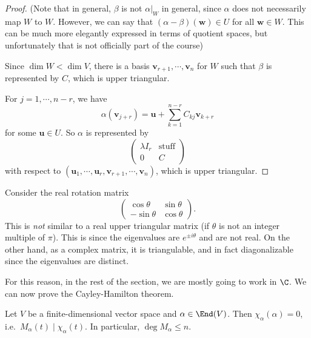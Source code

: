 \documentclass[a4paper]{article}
\begin{document}
\begin{proof}
  (Note that in general, $\beta$ is not $\alpha|_W$ in general, since $\alpha$ does not necessarily map $W$ to $W$. However, we can say that $(\alpha - \beta) (\mathbf{w}) \in U$ for all $\mathbf{w}\in W$. This can be much more elegantly expressed in terms of quotient spaces, but unfortunately that is not officially part of the course)

  Since $\dim W < \dim V$, there is a basis $\mathbf{v}_{r + 1}, \cdots, \mathbf{v}_n$ for $W$ such that $\beta$ is represented by $C$, which is upper triangular.

  For $j = 1, \cdots, n - r$, we have
  \[
    \alpha(\mathbf{v}_{j + r}) = \mathbf{u} + \sum_{k = 1}^{n - r} C_{kj} \mathbf{v}_{k + r}
  \]
  for some $\mathbf{u} \in U$. So $\alpha$ is represented by
  \[
    \begin{pmatrix}
      \lambda I_r & \text{stuff}\\
      0 & C
    \end{pmatrix}
  \]
  with respect to $(\mathbf{u}_1, \cdots, \mathbf{u}_r, \mathbf{v}_{r + 1}, \cdots, \mathbf{v}_n)$, which is upper triangular.
\end{proof}

\begin{eg}
  Consider the real rotation matrix
  \[
    \begin{pmatrix}
      \cos \theta & \sin \theta\\
      -\sin \theta & \cos \theta
    \end{pmatrix}.
  \]
  This is \emph{not} similar to a real upper triangular matrix (if $\theta$ is not an integer multiple of $\pi$). This is since the eigenvalues are $e^{\pm i\theta}$ and are not real. On the other hand, as a complex matrix, it is triangulable, and in fact diagonalizable since the eigenvalues are distinct.
\end{eg}
For this reason, in the rest of the section, we are mostly going to work in $\C$. We can now prove the Cayley-Hamilton theorem.

\begin{thm}
  Let $V$ be a finite-dimensional vector space and $\alpha \in \End(V)$. Then $\chi_\alpha(\alpha) = 0$, i.e.\ $M_\alpha(t) \mid \chi_\alpha(t)$. In particular, $\deg M_\alpha \leq n$.
\end{thm}
\end{document}
